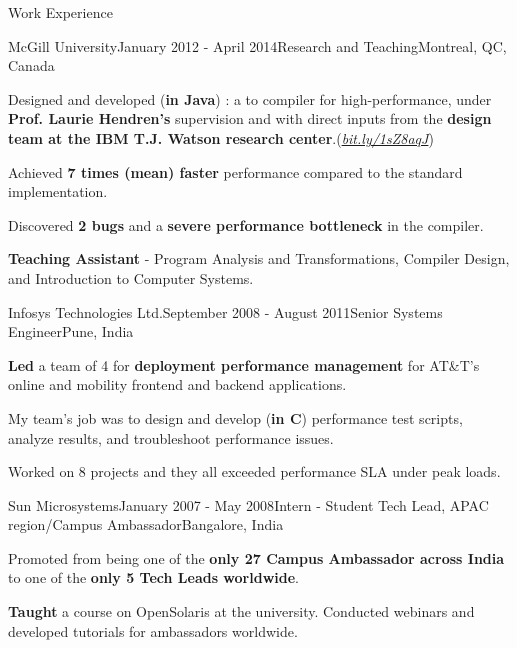 \documentclass{resume} %
\begin{document}
\begin{rSection}{Work Experience}
\begin{rSubsection}{McGill University}{January 2012 - April 2014}{Research and
Teaching}{Montreal, QC, Canada}
\begin{lsubSubsection}
\item Designed and developed (\textbf{in Java}) \mixtenx: a \matlab to
\xten  compiler for high-performance, under \textbf{Prof.
Laurie Hendren's} supervision and with direct inputs from the \textbf{\xten
design team at the IBM T.J. Watson research
center}.(\href{http://bit.ly/1sZ8aqJ}{\em{bit.ly/1sZ8aqJ}})  
 \item Achieved \textbf{7 times (mean) faster} performance compared to the
 standard \matlab implementation.
  \item Discovered \textbf{2 bugs} and a \textbf{severe performance bottleneck}
in the \xten compiler.  
\end{lsubSubsection}
\item \textbf{Teaching Assistant} - Program Analysis and Transformations,
	Compiler Design, and Introduction to Computer Systems.
\end{rSubsection}

\begin{rSubsection}{Infosys Technologies Ltd.}{September 2008 - August
2011}{Senior Systems Engineer}{Pune, India}
\item \textbf{Led} a team of 4 for \textbf{deployment performance management}
for AT\&T's online and mobility frontend and backend applications.
\begin{lsubSubsection}
\item My team's job was to design and develop (\textbf{in C}) performance
test scripts, analyze results, and troubleshoot performance issues.  
\item {Worked on 8 projects} and they all exceeded performance SLA under
peak loads.
\end{lsubSubsection}
\end{rSubsection}

\begin{rSubsection}{Sun Microsystems}{January 2007 - May 2008}{Intern - Student
Tech Lead, APAC region/Campus Ambassador}{Bangalore, India}
\item Promoted from being one of the \textbf{only 27 Campus Ambassador across India}
to one of the \textbf{only 5 Tech Leads worldwide}.  
\begin{lsubSubsection}
\item \textbf{Taught} a course on OpenSolaris at the university. Conducted
webinars and developed tutorials for ambassadors worldwide.
\end{lsubSubsection}
\end{rSubsection}
\end{rSection}
\end{document}
